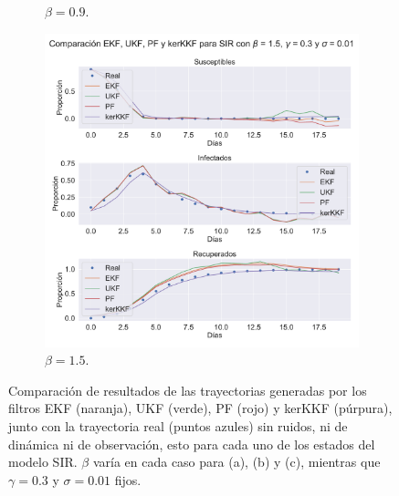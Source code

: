 \begin{figure}[h]
\begin{subfigure}[b]{0.49\textwidth}
    \caption{$\beta = 0.9$.}
    \label{fig:nonlinear_filters_sir_beta_09}
    \end{subfigure}
    \begin{subfigure}[b]{0.49\textwidth}
        \includegraphics[width=\linewidth]{img/content/chapter4/nonlinear_filters_sir_beta_15.pdf}
    \caption{$\beta = 1.5$.}
    \label{fig:nonlinear_filters_sir_beta_15}
    \end{subfigure}
    \caption{Comparación de resultados de las trayectorias generadas por los filtros EKF (naranja), UKF (verde), PF (rojo) y kerKKF (púrpura), junto con la trayectoria real (puntos azules) sin ruidos, ni de dinámica ni de observación, esto para cada uno de los estados del modelo SIR. $\beta$ varía en cada caso para (a), (b) y (c), mientras que $\gamma = 0.3$ y $\sigma = 0.01$ fijos.}
\end{figure}

